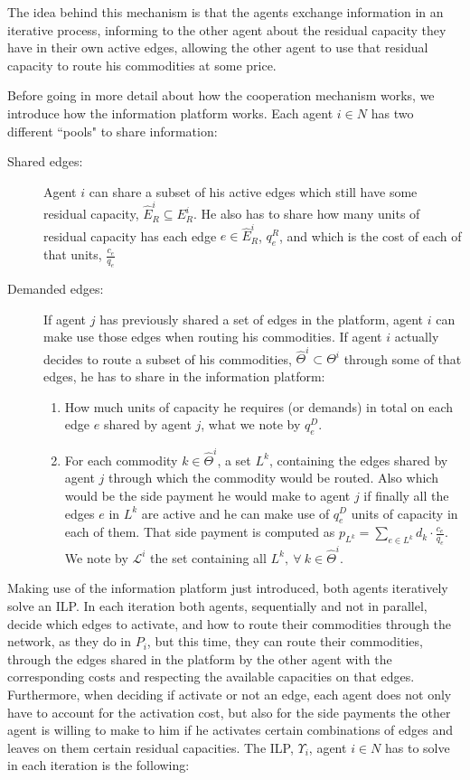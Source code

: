 \documentclass[authoryear]{elsarticle}
\begin{document}
The idea behind this mechanism is that the agents exchange information in an iterative process, informing to the other agent about the residual capacity they have in their own active edges, allowing the other agent to use that residual capacity to route his commodities at some price.

Before going in more detail about how the cooperation mechanism works, we introduce how the information platform works. Each agent $i\in N$ has two different ``pools" to share information:

\begin{description}
	\item[Shared edges:] Agent $i$ can share a subset of his active edges which still have some residual capacity, $\widehat{E}_R^i\subseteq E_R^i$. He also has to share how many units of residual capacity has each edge $e\in \widehat{E}_R^i$, $q_e^R$, and which is the cost of each of that units, $\frac{c_e}{q_e}$
	\item[Demanded edges:] If agent $j$ has previously shared a set of edges in the platform, agent $i$ can make use those edges when routing his commodities. If agent $i$ actually decides to route a subset of his commodities, $\widehat{\Theta}^i\subset \Theta ^i$ through some of that edges, he has to share in the information platform:
	\begin{enumerate}
		\item How much units of capacity he requires (or demands) in total on each edge $e$ shared by agent $j$, what we note by $q_e^D$.
	\item For each commodity $k\in \widehat{\Theta}^i$, a set $L^k$, containing the edges shared by agent $j$ through which the commodity would be routed. Also which would be the side payment he would make to agent $j$ if finally all the edges $e$ in $L^k$ are active and he can make use of $q_e^D$ units of capacity in each of them. That side payment is computed as $p_{L^k}=\sum_{e \in L^k} d_k\cdot \frac{c_e}{q_e}$. We note by $\mathcal{L}^i$ the set containing all $L^k,\ \forall\ k \in \widehat{\Theta}^i$.
	\end{enumerate}
		
\end{description}	

Making use of the information platform just introduced, both agents iteratively solve an ILP. In each iteration both agents, sequentially and not in parallel, decide which edges to activate, and how to route their commodities through the network, as they do in $P_i$, but this time, they can route their commodities, through the edges shared in the platform by the other agent with the corresponding costs and respecting the available capacities on that edges. Furthermore, when deciding if activate or not an edge, each agent does not only have to account for the activation cost, but also for the side payments the other agent is willing to make to him if he activates certain combinations of edges and leaves on them certain residual capacities. The ILP, $\Upsilon_i$, agent $i\in N$ has to solve in each iteration is the following:
\end{document}
